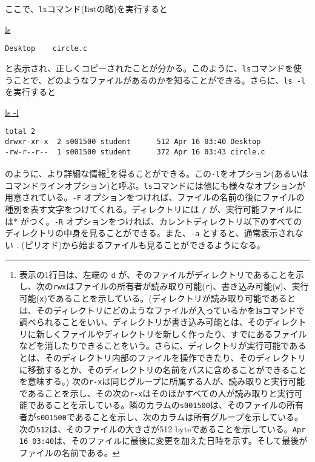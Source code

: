 ここで、{\tt ls}コマンド({\bf l}i{\bf s}tの略)を実行すると
\begin{commandline2}
\prompt \underline{ls}
\vspace*{-.8em} 
\begin{verbatim}
Desktop    circle.c
\end{verbatim}
\end{commandline2} \noindent
と表示され、正しくコピーされたことが分かる。このように、{\tt ls}コマンドを使うことで、どのようなファイルがあるのかを知ることができる。さらに、{\tt ls -l}を実行すると
\begin{commandline2}
\prompt \underline{ls -l}
\vspace*{-.8em} 
\begin{verbatim}
total 2
drwxr-xr-x  2 s001500 student      512 Apr 16 03:40 Desktop
-rw-r--r--  1 s001500 student      372 Apr 16 03:43 circle.c
\end{verbatim}
\end{commandline2} \noindent
のように、より詳細な情報\footnote{表示の1行目は、左端の {\tt d} が、そのファイルがディレクトリであることを示し、次の{\tt rwx}はファイルの所有者が読み取り可能({\tt r})、書き込み可能({\tt w})、実行可能({\tt x})であることを示している。(ディレクトリが読み取り可能であるとは、そのディレクトリにどのようなファイルが入っているかを{\bf ls}コマンドで調べられることをいい、ディレクトリが書き込み可能とは、そのディレクトリに新しくファイルやディレクトリを新しく作ったり、すでにあるファイルなどを消したりできることをいう。さらに、ディレクトリが実行可能であるとは、そのディレクトリ内部のファイルを操作できたり、そのディレクトリに移動するとか、そのディレクトリの名前をパスに含めることができることを意味する。) 次の{\tt r-x}は同じグループに所属する人が、読み取りと実行可能であることを示し、その次の{\tt r-x}はそのほかすべての人が読み取りと実行可能であることを示している。隣のカラムの{\tt s001500}は、そのファイルの所有者が{\tt s001500}であることを示し、次のカラムは所有グループを示している。次の{\tt 512}は、そのファイルの大きさが512 byteであることを示している。{\tt Apr 16 03:40}は、そのファイルに最後に変更を加えた日時を示す。そして最後がファイルの名前である。}を得ることができる。この{\tt -l}をオプション(あるいはコマンドラインオプション)と呼ぶ。{\tt ls}コマンドには他にも様々なオプションが用意されている。{\tt -F} オプションをつければ、ファイルの名前の後にファイルの種別を表す文字をつけてくれる。ディレクトリには {\tt /} が、実行可能ファイルには{\tt $ \ast$} がつく。{\tt -R} オプションをつければ、カレントディレクトリ以下のすべてのディレクトリの中身を見ることができる。また、{\tt -a} とすると、通常表示されない . (ピリオド)から始まるファイルも見ることができるようになる。


